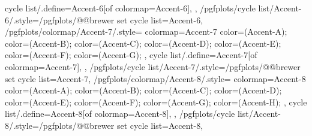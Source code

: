 {{    cycle list/.define={Accent-6}{[of colormap=Accent-6]},
  },
  /pgfplots/cycle list/Accent-6/.style={/pgfplots/@@brewer set cycle list={Accent-6}},
  /pgfplots/colormap/Accent-7/.style={
    colormap={Accent-7}{
      color=(Accent-A);
      color=(Accent-B);
      color=(Accent-C);
      color=(Accent-D);
      color=(Accent-E);
      color=(Accent-F);
      color=(Accent-G);
    },
    cycle list/.define={Accent-7}{[of colormap=Accent-7]},
  },
  /pgfplots/cycle list/Accent-7/.style={/pgfplots/@@brewer set cycle list={Accent-7}},
  /pgfplots/colormap/Accent-8/.style={
    colormap={Accent-8}{
      color=(Accent-A);
      color=(Accent-B);
      color=(Accent-C);
      color=(Accent-D);
      color=(Accent-E);
      color=(Accent-F);
      color=(Accent-G);
      color=(Accent-H);
    },
    cycle list/.define={Accent-8}{[of colormap=Accent-8]},
  },
  /pgfplots/cycle list/Accent-8/.style={/pgfplots/@@brewer set cycle list={Accent-8}},
}

